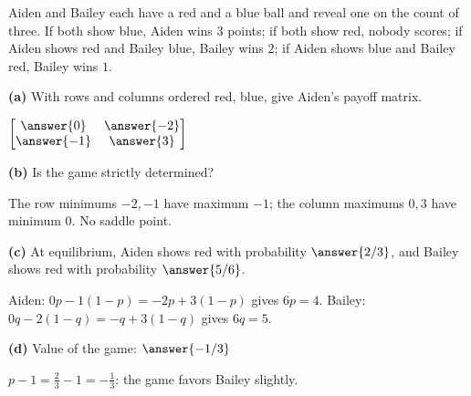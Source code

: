 \documentclass[12pt]{ximera}
\begin{document}
\begin{problem}
Aiden and Bailey each have a red and a blue ball and reveal one on the count of three. If
both show blue, Aiden wins $3$ points; if both show red, nobody scores; if Aiden shows red
and Bailey blue, Bailey wins $2$; if Aiden shows blue and Bailey red, Bailey wins $1$.

\begin{prompt}
\textbf{(a)} With rows and columns ordered red, blue, give Aiden's payoff matrix.

$\begin{bmatrix} \answer{0} & \answer{-2}\\ \answer{-1} & \answer{3} \end{bmatrix}$
\end{prompt}

\begin{prompt}
\textbf{(b)} Is the game strictly determined?
\begin{multipleChoice}
\end{multipleChoice}
\begin{feedback}
The row minimums $-2,-1$ have maximum $-1$; the column maximums $0,3$ have minimum $0$. No
saddle point.
\end{feedback}
\end{prompt}

\begin{prompt}
\textbf{(c)} At equilibrium, Aiden shows red with probability $\answer{2/3}$, and Bailey
shows red with probability $\answer{5/6}$.
\begin{feedback}
Aiden: $0p-1(1-p)=-2p+3(1-p)$ gives $6p=4$. Bailey: $0q-2(1-q)=-q+3(1-q)$ gives $6q=5$.
\end{feedback}
\end{prompt}

\begin{prompt}
\textbf{(d)} Value of the game: $\answer{-1/3}$
\begin{feedback}
$p-1=\frac23-1=-\frac13$: the game favors Bailey slightly.
\end{feedback}
\end{prompt}
\end{problem}
\end{document}
